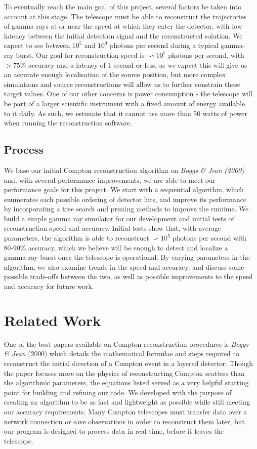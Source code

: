 To eventually reach the main goal of this project, several factors be taken into account at this stage. The telescope must be able to reconstruct the trajectories of gamma rays at or near the speed at which they enter the detector, with low latency between the initial detection signal and the reconstructed solution. We expect to see between $10^5$ and $10^9$ photons per second during a typical gamma-ray burst\cite{UMD}. Our goal for reconstruction speed is $\backsim 10^5$ photons per second, with $>75\%$ accuracy and a latency of 1 second or less, as we expect this will give us an accurate enough localisation of the source position, but more complex simulations and source reconstructions will allow us to further constrain these target values. One of our other concerns is power consumption - the telescope will be part of a larger scientific instrument with a fixed amount of energy available to it daily. As such, we estimate that it cannot use more than 50 watts of power when running the reconstruction software.

\subsection{Process}
We base our initial Compton reconstruction algorithm on \emph{Boggs \& Jean (2000)}\cite{Boggs} and, with several performance improvements, we are able to meet our performance goals for this project. We start with a sequential algorithm, which enumerates each possible ordering of detector hits, and improve its performance by incorporating a tree search and pruning methods to improve the runtime. We build a simple gamma ray simulator for our development and initial tests of reconstruction speed and accuracy. Initial tests show that, with average parameters, the algorithm is able to reconstruct $\backsim 10^5$ photons per second with 80-90\% accuracy, which we believe will be enough to detect and localize a gamma-ray burst once the telescope is operational. By varying parameters in the algorithm, we also examine trends in the speed and accuracy, and discuss some possible trade-offs between the two, as well as possible improvements to the speed and accuracy for future work.

\section{Related Work}
One of the best papers available on Compton reconstruction procedures is \emph{Boggs \& Jean} (2000)\cite{Boggs} which details the mathematical formulae and steps required to reconstruct the initial direction of a Compton event in a layered detector. Though the paper focuses more on the physics of reconstructing Compton scatters than the algorithmic parameters, the equations listed served as a very helpful starting point for building and refining our code. We developed with the purpose of creating an algorithm to be as fast and lightweight as possible while still meeting our accuracy requirements. Many Compton telescopes must transfer data over a network connection or save observations in order to reconstruct them later, but our program is designed to process data in real time, before it leaves the telescope.

